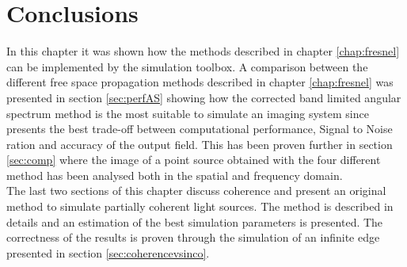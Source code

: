 \section{Conclusions}
In this  chapter it was shown how the methods described in chapter \ref{chap:fresnel} can be implemented by the simulation toolbox. A comparison between the different free space propagation methods described in chapter \ref{chap:fresnel} was presented in section \ref{sec:perfAS} showing how the corrected band limited angular spectrum method is the most suitable to simulate an imaging system since presents the best trade-off between computational performance, Signal to Noise ration and accuracy of the output field. This has been proven further in section \ref{sec:comp} where the image of a point source obtained with the four different method has been analysed both in the spatial and frequency domain. \\
The last two sections of this chapter discuss coherence and present an original method to simulate partially coherent light sources. The method is described in details and an estimation of the best simulation parameters is presented. The correctness of the results is proven through the simulation of an infinite edge presented in section \ref{sec:coherencevsinco}. 

